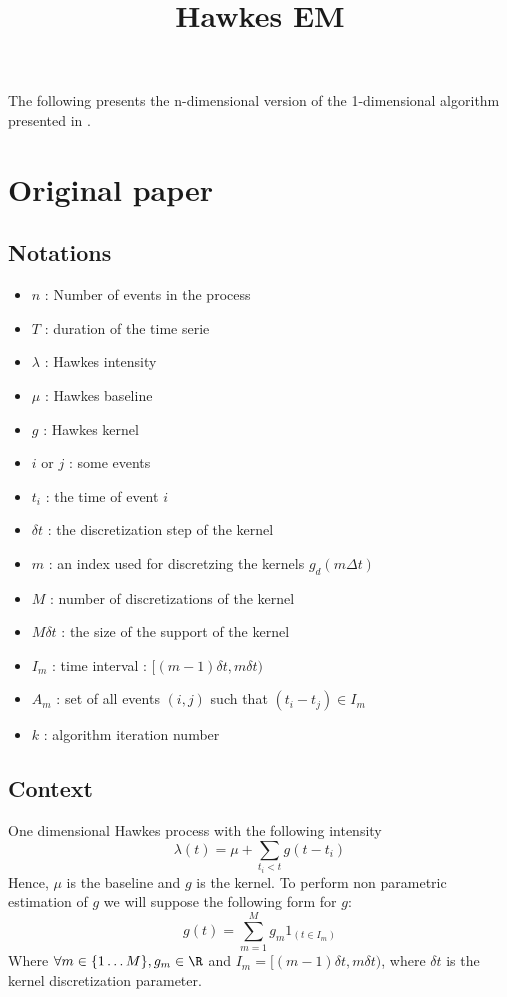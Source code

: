 \documentclass[a4paper]{article}
\title{Hawkes EM}
\date{\vspace{-5ex}} %
\begin{document}
\maketitle

The following presents the n-dimensional version of the 1-dimensional algorithm
presented in \citep{lewis2011nonparametric}.

\section{Original paper} %
\label{sec:original_paper}

\subsection{Notations}
\begin{itemize}
\item $n$ : Number of events in the process
\item $T$ : duration of the time serie
\item $\lambda$ : Hawkes intensity
\item $\mu$ : Hawkes baseline
\item $g$ : Hawkes kernel
\item $i$ or $j$ : some events
\item $t_i$ : the time of event $i$
\item $\delta t$ : the discretization step of the kernel
\item $m$ : an index used for discretzing the kernels $g_d(m\Delta t)$
\item $M$ : number of discretizations of the kernel
\item $M \delta t$ : the size of the support of the kernel
\item $I_m$ : time interval : $[(m-1) \delta t, m \delta t)$
\item $A_m$ : set of all events $(i, j)$ such that $(t_i - t_j) \in I_m$
\item $k$ : algorithm iteration number
\end{itemize}

\subsection{Context} %
\label{sub:context}

One dimensional Hawkes process with the following intensity
\begin{equation}
\label{eq:one_dimensional_intensity}
	\lambda(t) = \mu + \sum_{t_i < t} g(t - t_i)
\end{equation}
Hence, $\mu$ is the baseline and $g$ is the kernel.
To perform non parametric estimation of $g$ we will suppose the following form for $g$:
\[
	g(t) = \sum_{m=1}^{M} g_m 1_{(t \in I_m)}
\]
Where $\forall m \in \{1 \dots M\}, g_m \in \R$ and $I_m = [(m-1) \delta t, m \delta t)$, where $\delta t$ is
the kernel discretization parameter.
\end{document}
